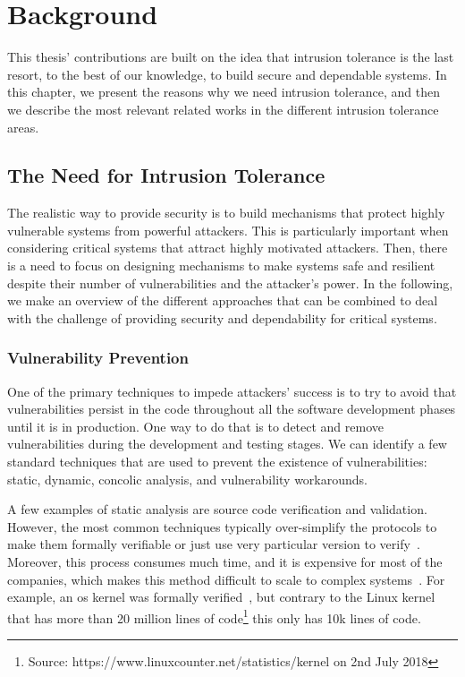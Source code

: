 \chapter{Background}
\label{chap:related_work}

This thesis' contributions are built on the idea that intrusion tolerance is the last resort, to the best of our knowledge, to build secure and dependable systems.
In this chapter, we present the reasons why we need intrusion tolerance, and then we describe the most relevant related works in the different intrusion tolerance areas.


\section{The Need for Intrusion Tolerance}
The realistic way to provide security is to build mechanisms that protect highly vulnerable systems from powerful attackers.
This is particularly important when considering critical systems that attract highly motivated attackers. 
Then, there is a need to focus on designing mechanisms to make systems safe and resilient despite their number of vulnerabilities and the attacker's power.
In the following, we make an overview of the different approaches that can be combined to deal with the challenge of providing security and dependability for critical systems.

\subsection{Vulnerability Prevention}
One of the primary techniques to impede attackers' success is to try to avoid that vulnerabilities persist in the code throughout all the software development phases until it is in production. 
One way to do that is to detect and remove vulnerabilities during the development and testing stages.
We can identify a few standard techniques that are used to prevent the existence of vulnerabilities: static, dynamic, concolic analysis, and vulnerability workarounds.

A few examples of static analysis are source code verification and validation. 
However, the most common techniques typically over-simplify the protocols to make them formally verifiable or just use very particular version to verify~\cite{Klein:2009,Nelson:2017}. 
Moreover, this process consumes much time, and it is expensive for most of the companies, which makes this method difficult to scale to complex systems~\cite{Giuffrida:2013}.
For example, an \gls{os} kernel was formally verified~\cite{Klein:2009}, but contrary to the Linux kernel that has more than 20 million lines of code\footnote{Source: https://www.linuxcounter.net/statistics/kernel on 2nd July 2018} this only has 10k lines of code.


